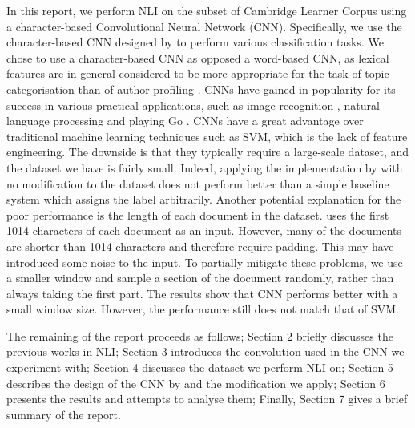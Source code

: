 In this report, we perform NLI on the subset of Cambridge Learner Corpus  \citep{nicholls2003cambridge, yannakoudakis2011new} using a character-based Convolutional Neural Network (CNN).
Specifically, we use the character-based CNN designed by \cite{zhang2015character} to perform various classification tasks.
We chose to use a character-based CNN as opposed a word-based CNN, as lexical features are in general considered to be more appropriate for the task of topic categorisation than of author profiling  \citep{kochmar2011identification}.
CNNs have gained in popularity for its success in various practical applications, such as image recognition \citep{krizhevsky2012imagenet, simonyan2014very, he2016deep}, natural language processing \citep{jackson2007natural, collobert2011natural, kalchbrenner2014convolutional} and playing Go \citep{silver2016mastering}.
CNNs have a great advantage over traditional machine learning techniques such as SVM, which is the lack of feature engineering.
The downside is that they typically require a large-scale dataset, and the dataset we have is fairly small.
Indeed, applying the implementation by  \cite{zhang2015character} with no modification to the dataset does not perform better than a simple baseline system which assigns the label arbitrarily.
Another potential explanation for the poor performance is the length of each document in the dataset.
\cite{zhang2015character} uses the first 1014 characters of each document as an input.
However, many of the documents are shorter than 1014 characters and therefore require padding.
This may have introduced some noise to the input.
To partially mitigate these problems, we use a smaller window and sample a section of the document randomly, rather than always taking the first part.
The results show that CNN performs better with a small window size.
However, the performance still does not match that of SVM.

The remaining of the report proceeds as follows; Section 2 briefly discusses the previous works in NLI; Section 3 introduces the convolution used in the CNN we experiment with; Section 4 discusses the dataset we perform NLI on; Section 5 describes the design of the CNN by \cite{zhang2015character} and the modification we apply; Section 6 presents the results and attempts to analyse them; Finally, Section 7 gives a brief summary of the report.